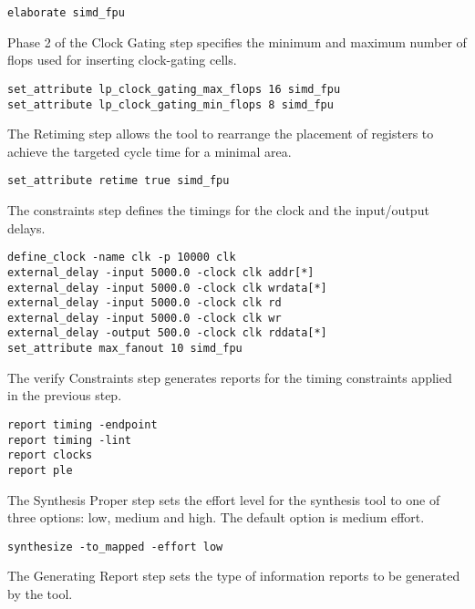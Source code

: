 \documentclass[conference]{IEEEtran}
\begin{document}
\begin{framed}
\begin{lstlisting}
elaborate simd_fpu
\end{lstlisting}
\end{framed}
Phase 2 of the Clock Gating step specifies the minimum and maximum number of flops used for inserting clock-gating cells.
\begin{framed}
\begin{lstlisting}
set_attribute lp_clock_gating_max_flops 16 simd_fpu
set_attribute lp_clock_gating_min_flops 8 simd_fpu
\end{lstlisting}
\end{framed}
The Retiming step allows the tool to rearrange the placement of registers to achieve the targeted cycle time for a minimal area.
\begin{framed}
\begin{lstlisting}
set_attribute retime true simd_fpu
\end{lstlisting}
\end{framed}
The constraints step defines the timings for the clock and the input/output delays. 
\begin{framed}
\begin{lstlisting}
define_clock -name clk -p 10000 clk
external_delay -input 5000.0 -clock clk addr[*]
external_delay -input 5000.0 -clock clk wrdata[*]
external_delay -input 5000.0 -clock clk rd
external_delay -input 5000.0 -clock clk wr
external_delay -output 500.0 -clock clk rddata[*]
set_attribute max_fanout 10 simd_fpu
\end{lstlisting}
\end{framed}
The verify Constraints step generates reports for the timing constraints applied in the previous step. 
\begin{framed}
\begin{lstlisting}
report timing -endpoint 
report timing -lint
report clocks
report ple
\end{lstlisting}
\end{framed}
The Synthesis Proper step sets the effort level for the synthesis tool to one of three options: low, medium and high. The default option is medium effort. 
\begin{framed}
\begin{lstlisting}
synthesize -to_mapped -effort low
\end{lstlisting}
\end{framed}
The Generating Report step sets the type of information reports to be generated by the tool. 
\end{document}
